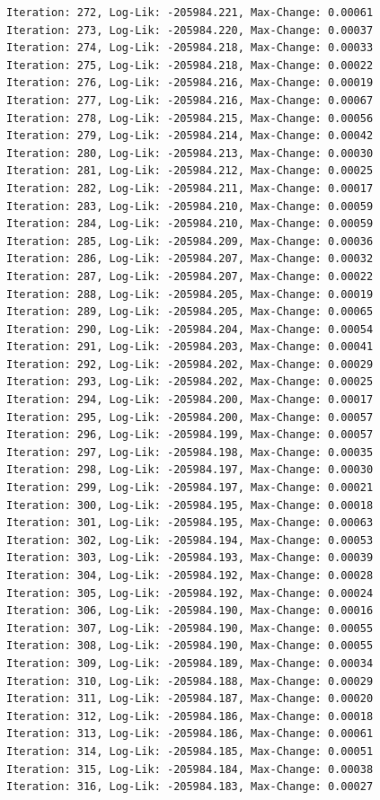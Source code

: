 \documentclass[
  letterpaper,
  DIV=11,
  numbers=noendperiod]{scrreport}
\begin{document}
\begin{verbatim}
Iteration: 272, Log-Lik: -205984.221, Max-Change: 0.00061
Iteration: 273, Log-Lik: -205984.220, Max-Change: 0.00037
Iteration: 274, Log-Lik: -205984.218, Max-Change: 0.00033
Iteration: 275, Log-Lik: -205984.218, Max-Change: 0.00022
Iteration: 276, Log-Lik: -205984.216, Max-Change: 0.00019
Iteration: 277, Log-Lik: -205984.216, Max-Change: 0.00067
Iteration: 278, Log-Lik: -205984.215, Max-Change: 0.00056
Iteration: 279, Log-Lik: -205984.214, Max-Change: 0.00042
Iteration: 280, Log-Lik: -205984.213, Max-Change: 0.00030
Iteration: 281, Log-Lik: -205984.212, Max-Change: 0.00025
Iteration: 282, Log-Lik: -205984.211, Max-Change: 0.00017
Iteration: 283, Log-Lik: -205984.210, Max-Change: 0.00059
Iteration: 284, Log-Lik: -205984.210, Max-Change: 0.00059
Iteration: 285, Log-Lik: -205984.209, Max-Change: 0.00036
Iteration: 286, Log-Lik: -205984.207, Max-Change: 0.00032
Iteration: 287, Log-Lik: -205984.207, Max-Change: 0.00022
Iteration: 288, Log-Lik: -205984.205, Max-Change: 0.00019
Iteration: 289, Log-Lik: -205984.205, Max-Change: 0.00065
Iteration: 290, Log-Lik: -205984.204, Max-Change: 0.00054
Iteration: 291, Log-Lik: -205984.203, Max-Change: 0.00041
Iteration: 292, Log-Lik: -205984.202, Max-Change: 0.00029
Iteration: 293, Log-Lik: -205984.202, Max-Change: 0.00025
Iteration: 294, Log-Lik: -205984.200, Max-Change: 0.00017
Iteration: 295, Log-Lik: -205984.200, Max-Change: 0.00057
Iteration: 296, Log-Lik: -205984.199, Max-Change: 0.00057
Iteration: 297, Log-Lik: -205984.198, Max-Change: 0.00035
Iteration: 298, Log-Lik: -205984.197, Max-Change: 0.00030
Iteration: 299, Log-Lik: -205984.197, Max-Change: 0.00021
Iteration: 300, Log-Lik: -205984.195, Max-Change: 0.00018
Iteration: 301, Log-Lik: -205984.195, Max-Change: 0.00063
Iteration: 302, Log-Lik: -205984.194, Max-Change: 0.00053
Iteration: 303, Log-Lik: -205984.193, Max-Change: 0.00039
Iteration: 304, Log-Lik: -205984.192, Max-Change: 0.00028
Iteration: 305, Log-Lik: -205984.192, Max-Change: 0.00024
Iteration: 306, Log-Lik: -205984.190, Max-Change: 0.00016
Iteration: 307, Log-Lik: -205984.190, Max-Change: 0.00055
Iteration: 308, Log-Lik: -205984.190, Max-Change: 0.00055
Iteration: 309, Log-Lik: -205984.189, Max-Change: 0.00034
Iteration: 310, Log-Lik: -205984.188, Max-Change: 0.00029
Iteration: 311, Log-Lik: -205984.187, Max-Change: 0.00020
Iteration: 312, Log-Lik: -205984.186, Max-Change: 0.00018
Iteration: 313, Log-Lik: -205984.186, Max-Change: 0.00061
Iteration: 314, Log-Lik: -205984.185, Max-Change: 0.00051
Iteration: 315, Log-Lik: -205984.184, Max-Change: 0.00038
Iteration: 316, Log-Lik: -205984.183, Max-Change: 0.00027

\end{verbatim}
\end{document}
